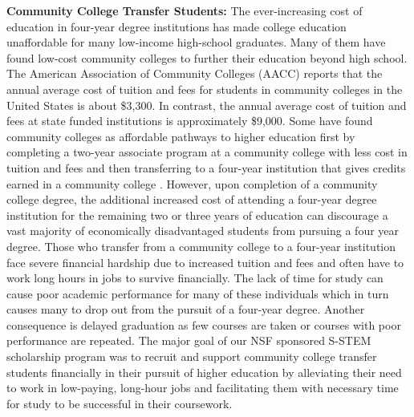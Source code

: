 \documentclass{article}
\begin{document}
\textbf{Community College Transfer Students:} The ever-increasing cost of education in four-year degree institutions has made college education unaffordable for many low-income high-school graduates. Many of them have found low-cost community colleges to further their education beyond high school. The American Association of Community Colleges (AACC) reports that the annual average cost of tuition and fees for students in community colleges in the United States is about \$3,300. In contrast, the annual average cost of tuition and fees at state funded institutions is approximately \$9,000. Some have found community colleges as affordable pathways to higher education first by completing a two-year associate program at a community college with less cost in tuition and fees and then transferring to a four-year institution that gives credits earned in a community college \cite{hagedorn2012realistic, springer, cerna, slater2006lessons, summers2006preparing}. However, upon completion of a community college degree, the additional increased cost of attending a four-year degree institution for the remaining two or three years of education can discourage a vast majority of  economically disadvantaged students from pursuing a four year degree. Those who transfer from a community college to a four-year institution face severe financial hardship due to increased tuition and fees and often have to work long hours in jobs to survive financially. The lack of time for study can cause poor academic performance for many of these individuals which in turn causes many to drop out from the pursuit of a four-year degree. Another consequence is delayed graduation as few courses are taken or courses with poor performance are repeated. The major goal of our NSF sponsored S-STEM scholarship program was to recruit and support community college transfer students financially in their pursuit of higher education by alleviating their need to work in low-paying, long-hour jobs and facilitating them with necessary time for study to be successful in their coursework.
\end{document}
